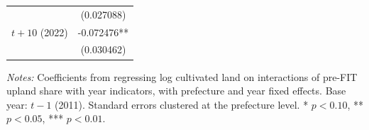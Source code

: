 \begin{table}[H]
\begin{threeparttable}
\begin{tabular}{lc}
 & (0.027088) \\
\addlinespace
$t+10$ (2022) & -0.072476** \\
 & (0.030462) \\
\bottomrule
\end{tabular}
\begin{tablenotes}[flushleft]
\small
\item \textit{Notes:} Coefficients from regressing log cultivated land on interactions of pre-FIT upland share with year indicators, with prefecture and year fixed effects. Base year: $t-1$ (2011). Standard errors clustered at the prefecture level. * $p<0.10$, ** $p<0.05$, *** $p<0.01$.
\end{tablenotes}
\end{threeparttable}
\label{tab:eventstudy}
\end{table}

